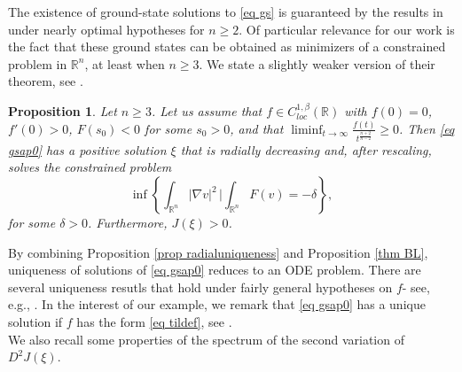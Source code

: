 \documentclass[11pt,letterpaper,reqno]{amsart}
\newcommand{\R}{\mathbb{R}}
\theoremstyle{plain}%
\newtheorem{proposition}[theorem]{Proposition}
\theoremstyle{definition}
\numberwithin{equation}{section}
\numberwithin{figure}{section}
\begin{document}
The existence of ground-state solutions to \eqref{eq gs} is guaranteed by the results in \cite{berestycki1980existence} under nearly optimal hypotheses for $n\geq 2$. Of particular relevance for our work is the fact that these ground states can be obtained as minimizers of a constrained problem in $\R^n$, at least when $n\geq 3$. We state a slightly weaker version of their theorem, see \cite[Theorem 1.1 and Section 1.3]{berestycki1980existence}.
\begin{proposition}\label{thm BL}
   Let $n\geq 3$. Let us assume that $f \in C_{loc}^{1,\beta}(\R)$ with $f(0)=0$, $f'(0)>0$, $F(s_0)<0$ for some $s_0>0$, and that $\liminf_{t\to \infty} \frac{f(t)}{t^\frac{n+2}{n-2}}\geq 0$. Then \eqref{eq gsap0} has a positive solution $\xi$ that is radially decreasing and, after rescaling, solves the constrained problem
   \begin{equation}\label{eqBL}
       \inf\left\{ \int_{\R^n}|\nabla v|^2 \, \Big| \int_{\R^n}F(v) =-\delta \right\},
   \end{equation}
   for some $\delta>0$. Furthermore, $J(\xi)>0$.
\end{proposition}

By combining Proposition \ref{prop radialuniqueness} and Proposition \eqref{thm BL}, uniqueness of solutions of \eqref{eq gsap0} reduces to an ODE problem. There are several uniqueness resutls that hold under fairly general hypotheses on $f$- see, e.g., \cite{chen1991uniqueness, mcleod1993uniqueness}. In the interest of our example, we remark that \eqref{eq gsap0} has a unique solution if $f$ has the form \eqref{eq tildef}, see \cite[Example 2]{chen1991uniqueness}.\\

We also recall some properties of the spectrum of the second variation of $D^2 J(\xi)$.
\end{document}
